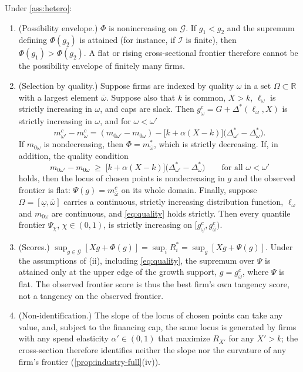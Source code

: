 \begin{proposition}\label{prop:industry}
Under \autoref{ass:hetero}:
\begin{enumerate}
\item[(i)] (Possibility envelope.) $\Phi$ is nonincreasing on $\mathcal G$. If $g_1<g_2$ and the supremum defining $\Phi(g_2)$ is attained (for instance, if $\mathcal I$ is finite), then $\Phi(g_1)>\Phi(g_2)$. A flat or rising cross-sectional frontier therefore cannot be the possibility envelope of finitely many firms.
\item[(ii)] (Selection by quality.) Suppose firms are indexed by quality $\omega$ in a set $\Omega\subset\mathbb R$ with a largest element $\bar\omega$. Suppose also that $k$ is common, $X>k$, $\ell_\omega$ is strictly increasing in $\omega$, and caps are slack. Then $g_\omega^c=G+\Delta^*(\ell_\omega,X)$ is strictly increasing in $\omega$, and for $\omega<\omega'$
\begin{equation}\label{eq:locus}
m_{\omega'}^c-m_\omega^c=(m_{0\omega'}-m_{0\omega})-\bigl[k+\alpha(X-k)\bigr]\bigl(\Delta_{\omega'}^*-\Delta_\omega^*\bigr).
\end{equation}
If $m_{0\omega}$ is nondecreasing, then $\Phi=m_{\bar\omega}^*$, which is strictly decreasing. If, in addition, the quality condition
\begin{equation}\label{eq:quality}
m_{0\omega'}-m_{0\omega}\;\ge\;\bigl[k+\alpha(X-k)\bigr]\bigl(\Delta_{\omega'}^*-\Delta_\omega^*\bigr)\qquad\text{for all }\omega<\omega'
\end{equation}
holds, then the locus of chosen points is nondecreasing in $g$ and the observed frontier is flat: $\Psi(g)=m_{\bar\omega}^c$ on its whole domain. Finally, suppose $\Omega=[\underline\omega,\bar\omega]$ carries a continuous, strictly increasing distribution function, $\ell_\omega$ and $m_{0\omega}$ are continuous, and \eqref{eq:quality} holds strictly. Then every quantile frontier $\Psi_\chi$, $\chi\in(0,1)$, is strictly increasing on $[g_{\underline\omega}^c,g_{\bar\omega}^c)$.
\item[(iii)] (Scores.) $\sup_{g\in\mathcal G}[Xg+\Phi(g)]=\sup_iR_i^*=\sup_g[Xg+\Psi(g)]$. Under the assumptions of (ii), including \eqref{eq:quality}, the supremum over $\Psi$ is attained only at the upper edge of the growth support, $g=g_{\bar\omega}^c$, where $\Psi$ is flat. The observed frontier score is thus the best firm's own tangency score, not a tangency on the observed frontier.
\item[(iv)] (Non-identification.) The slope of the locus of chosen points can take any value, and, subject to the financing cap, the same locus is generated by firms with any spend elasticity $\alpha'\in(0,1)$ that maximize $R_{X'}$ for any $X'>k$; the cross-section therefore identifies neither the slope nor the curvature of any firm's frontier (\autoref{prop:industry-full}(iv)).

\end{enumerate}
\end{proposition}
